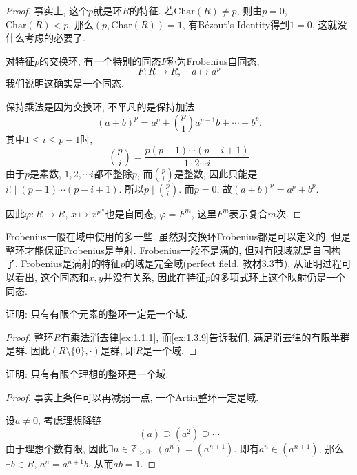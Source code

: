 \begin{proof}
    事实上, 这个$p$就是环$R$的特征. 若$\mathrm{Char}(R) \neq p$, 则由$p = 0$, $\mathrm{Char}(R) < p$. 那么$(p, \mathrm{Char}(R)) = 1$, 有Bézout's Identity得到$1 = 0$, 这就没什么考虑的必要了.

    对特征$p$的交换环, 有一个特别的同态$F$称为Frobenius自同态,
    \[
        F: R \to R, \quad a \mapsto a^p
    \]
    我们说明这确实是一个同态.
    
    保持乘法是因为交换环, 不平凡的是保持加法.
    \[
        (a + b)^p = a^p + \binom{p}{1}a^{p - 1}b + \cdots + b^p.
    \]
    其中$1 \leqslant i \leqslant p - 1$时,
    \[
        \binom{p}{i} = \frac{p(p - 1) \cdots (p - i + 1)}{1 \cdot 2 \cdots i} 
    \]
    由于$p$是素数, $1, 2, \cdots i$都不整除$p$, 而$\binom{p}{i}$是整数, 因此只能是$i! \mid (p - 1) \cdots (p - i + 1)$. 所以$p \mid \binom{p}{i}$. 而$p = 0$, 故$(a + b)^p = a^p + b^p$.

    因此$\varphi: R \to R,\, x \mapsto x^{p^m}$也是自同态, $\varphi = F^m$, 这里$F^m$表示复合$m$次.
\end{proof}

\begin{remark}
    Frobenius一般在域中使用的多一些. 虽然对交换环Frobenius都是可以定义的, 但是整环才能保证Frobenius是单射. Frobenius一般不是满的, 但对有限域就是自同构了. Frobenius是满射的特征$p$的域是完全域(perfect field, 教材3.3节). 从证明过程可以看出, 这个同态和$x, y$并没有关系, 因此在特征$p$的多项式环上这个映射仍是一个同态.
\end{remark}

\begin{problem}
    证明: 只有有限个元素的整环一定是一个域.
\end{problem}

\begin{proof}
    整环$R$有乘法消去律\ref{ex:1.1.1}, 而\ref{ex:1.3.9}告诉我们, 满足消去律的有限半群是群. 因此$(R \setminus \{0\}, \cdot)$是群, 即$R$是一个域.
\end{proof}

\begin{problem}\label{ex:2.1.4}
    证明: 只有有限个理想的整环是一个域.
\end{problem}

\begin{proof}
    事实上条件可以再减弱一点, 一个Artin整环一定是域.

    设$a \neq 0$, 考虑理想降链
    \[
        (a) \supseteq (a^2) \supseteq \cdots 
    \]
    由于理想个数有限, 因此$\exists n \in \mathbb{Z}_{>0},\, (a^n) = (a^{n + 1})$. 即有$a^n \in (a^{n + 1})$, 那么$\exists b \in R,\, a^n = a^{n + 1}b$, 从而$ab = 1$.
\end{proof}

